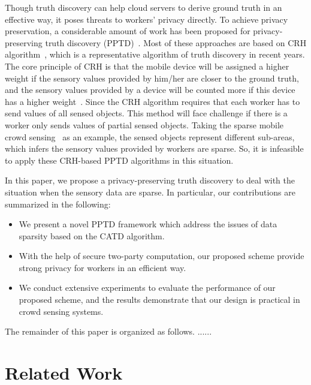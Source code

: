 \documentclass[conference]{IEEEtran}
\begin{document}
Though truth discovery can help cloud servers to derive ground truth in an effective way, it poses threats to workers' privacy directly.
To achieve privacy preservation, a considerable amount of work has been proposed for privacy-preserving truth discovery (PPTD)~\cite{miao_cloud-enabled_2015,xu_efficient_2019,zhang_reliable_2019,xue_inpptd_2020}.
Most of these approaches are based on CRH algorithm~\cite{li_resolving_2014}, which is a representative algorithm of truth discovery in recent years.
The core principle of CRH is that the mobile device will be assigned a higher weight if the sensory values provided by him/her are closer to the ground truth, and the sensory values provided by a device will be counted more if this device has a higher weight~\cite{miao_cloud-enabled_2015,xu_efficient_2019}.
Since the CRH algorithm requires that each worker has to send values of all sensed objects.
This method will face challenge if there is a worker only sends values of partial sensed objects.
Taking the sparse mobile crowd sensing~\cite{wang_sparse_2016} as an example, the sensed objects represent different sub-areas, which infers the sensory values provided by workers are sparse.
So, it is infeasible to apply these CRH-based PPTD algorithms in this situation.

In this paper, we propose a privacy-preserving truth discovery to deal with the situation when the sensory data are sparse.
In particular, our contributions are summarized in the following:

\begin{itemize}
  \item We present a novel PPTD framework which address the issues of data sparsity based on the CATD algorithm.
  \item With the help of secure two-party computation, our proposed scheme provide strong privacy for workers in an efficient way.
  \item We conduct extensive experiments to evaluate the performance of our proposed scheme, and the results demonstrate that our design is practical in crowd sensing systems.
\end{itemize}

The remainder of this paper is organized as follows. ......


\section{Related Work}~\label{sec2}
\end{document}

